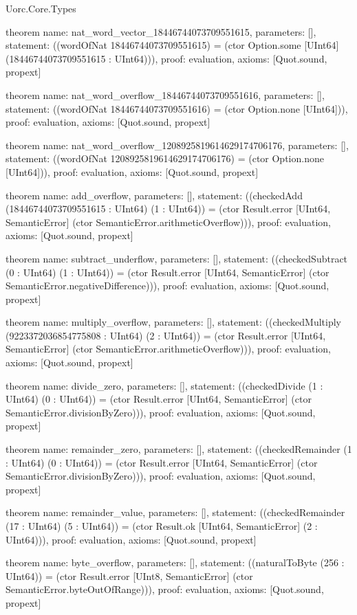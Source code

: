 \begin{lexlean}{Uorc.Core.Types}
\begin{semanticmodule}
theorem{
  name: nat_word_vector_18446744073709551615,
  parameters: [],
  statement: ((wordOfNat 18446744073709551615) = (ctor Option.some [UInt64] (18446744073709551615 : UInt64))),
  proof: evaluation{},
  axioms: [Quot.sound, propext]
}

theorem{
  name: nat_word_overflow_18446744073709551616,
  parameters: [],
  statement: ((wordOfNat 18446744073709551616) = (ctor Option.none [UInt64])),
  proof: evaluation{},
  axioms: [Quot.sound, propext]
}

theorem{
  name: nat_word_overflow_1208925819614629174706176,
  parameters: [],
  statement: ((wordOfNat 1208925819614629174706176) = (ctor Option.none [UInt64])),
  proof: evaluation{},
  axioms: [Quot.sound, propext]
}

theorem{
  name: add_overflow,
  parameters: [],
  statement: ((checkedAdd (18446744073709551615 : UInt64) (1 : UInt64)) = (ctor Result.error [UInt64, SemanticError] (ctor SemanticError.arithmeticOverflow))),
  proof: evaluation{},
  axioms: [Quot.sound, propext]
}

theorem{
  name: subtract_underflow,
  parameters: [],
  statement: ((checkedSubtract (0 : UInt64) (1 : UInt64)) = (ctor Result.error [UInt64, SemanticError] (ctor SemanticError.negativeDifference))),
  proof: evaluation{},
  axioms: [Quot.sound, propext]
}

theorem{
  name: multiply_overflow,
  parameters: [],
  statement: ((checkedMultiply (9223372036854775808 : UInt64) (2 : UInt64)) = (ctor Result.error [UInt64, SemanticError] (ctor SemanticError.arithmeticOverflow))),
  proof: evaluation{},
  axioms: [Quot.sound, propext]
}

theorem{
  name: divide_zero,
  parameters: [],
  statement: ((checkedDivide (1 : UInt64) (0 : UInt64)) = (ctor Result.error [UInt64, SemanticError] (ctor SemanticError.divisionByZero))),
  proof: evaluation{},
  axioms: [Quot.sound, propext]
}

theorem{
  name: remainder_zero,
  parameters: [],
  statement: ((checkedRemainder (1 : UInt64) (0 : UInt64)) = (ctor Result.error [UInt64, SemanticError] (ctor SemanticError.divisionByZero))),
  proof: evaluation{},
  axioms: [Quot.sound, propext]
}

theorem{
  name: remainder_value,
  parameters: [],
  statement: ((checkedRemainder (17 : UInt64) (5 : UInt64)) = (ctor Result.ok [UInt64, SemanticError] (2 : UInt64))),
  proof: evaluation{},
  axioms: [Quot.sound, propext]
}

theorem{
  name: byte_overflow,
  parameters: [],
  statement: ((naturalToByte (256 : UInt64)) = (ctor Result.error [UInt8, SemanticError] (ctor SemanticError.byteOutOfRange))),
  proof: evaluation{},
  axioms: [Quot.sound, propext]
}


\end{semanticmodule}
\end{lexlean}
